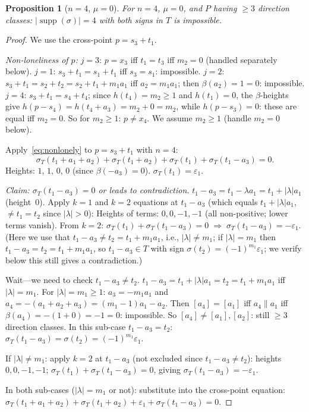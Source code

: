 \documentclass{article}
\newtheorem{prop}{Proposition}
\begin{document}
\begin{prop}[$n=4$, $\mu=0$]\label{prop:n4mu0}
For $n=4$, $\mu=0$, and $P$ having $\ge 3$ direction classes:
$|\operatorname{supp}(\sigma)|=4$ with both signs in $T$ is impossible.
\end{prop}
\begin{proof}
We use the cross-point $p=s_3+t_1$.

\textit{Non-loneliness of $p$:}
$j=3$: $p=x_3$ iff $t_1=t_3$ iff $m_2=0$ (handled separately below).
$j=1$: $s_3+t_1=s_1+t_1$ iff $s_3=s_1$: impossible.
$j=2$: $s_3+t_1=s_2+t_2=s_2+t_1+m_1a_1$ iff $a_2=m_1a_1$; then $\beta(a_2)=1=0$: impossible.
$j=4$: $s_3+t_1=s_4+t_4$; since $h(t_4)=m_2\ge 1$ and $h(t_1)=0$,
the $\beta$-heights give $h(p-s_4)=h(t_4+a_3)=m_2+0=m_2$, while $h(p-s_3)=0$:
these are equal iff $m_2=0$.  So for $m_2\ge 1$: $p\ne x_4$.
We assume $m_2\ge 1$ (handle $m_2=0$ below).

Apply~\eqref{eq:nonlonely} to $p=s_3+t_1$ with $n=4$:
\[
  \sigma_T(t_1+a_1+a_2)+\sigma_T(t_1+a_2)+\sigma_T(t_1)+\sigma_T(t_1-a_3)=0.
\]
Heights: $1$, $1$, $0$, $0$ (since $\beta(-a_3)=0$).
$\sigma_T(t_1)=\varepsilon_1$.

\textit{Claim: $\sigma_T(t_1-a_3)=0$ or leads to contradiction.}
$t_1-a_3=t_1-\lambda a_1=t_1+|\lambda|a_1$ (height~$0$).
Apply $k=1$ and $k=2$ equations at $t_1-a_3$ (which equals $t_1+|\lambda|a_1$, $\ne t_1=t_2$
since $|\lambda|>0$):
Heights of terms: $0,0,-1,-1$ (all non-positive; lower terms vanish).
From $k=2$: $\sigma_T(t_1)+\sigma_T(t_1-a_3)=0\;\Rightarrow\;\sigma_T(t_1-a_3)=-\varepsilon_1$.
(Here we use that $t_1-a_3\ne t_2=t_1+m_1a_1$, i.e., $|\lambda|\ne m_1$;
if $|\lambda|=m_1$ then $t_1-a_3=t_2=t_1+m_1a_1$, so $t_1-a_3\in T$ with sign
$\sigma(t_2)=(-1)^{m_1}\varepsilon_1$; we verify below this still gives a contradiction.)

Wait---we need to check $t_1-a_3\ne t_2$.  $t_1-a_3=t_1+|\lambda|a_1=t_2=t_1+m_1a_1$
iff $|\lambda|=m_1$.  For $|\lambda|=m_1\ge 1$: $a_3=-m_1a_1$ and $a_4=-(a_1+a_2+a_3)=(m_1-1)a_1-a_2$.
Then $[a_4]=[a_1]$ iff $a_4\parallel a_1$ iff $\beta(a_4)=-(1+0)=-1=0$: impossible.
So $[a_4]\ne[a_1],[a_2]$: still $\ge 3$ direction classes.
In this sub-case $t_1-a_3=t_2$: $\sigma_T(t_1-a_3)=\sigma(t_2)=(-1)^{m_1}\varepsilon_1$.

If $|\lambda|\ne m_1$: apply $k=2$ at $t_1-a_3$ (not excluded since $t_1-a_3\ne t_2$):
heights $0,0,-1,-1$; $\sigma_T(t_1)+\sigma_T(t_1-a_3)=0$, giving $\sigma_T(t_1-a_3)=-\varepsilon_1$.

In both sub-cases ($|\lambda|=m_1$ or not): substitute into the cross-point equation:
$\sigma_T(t_1+a_1+a_2)+\sigma_T(t_1+a_2)+\varepsilon_1+\sigma_T(t_1-a_3)=0$.


\end{proof}
\end{document}
